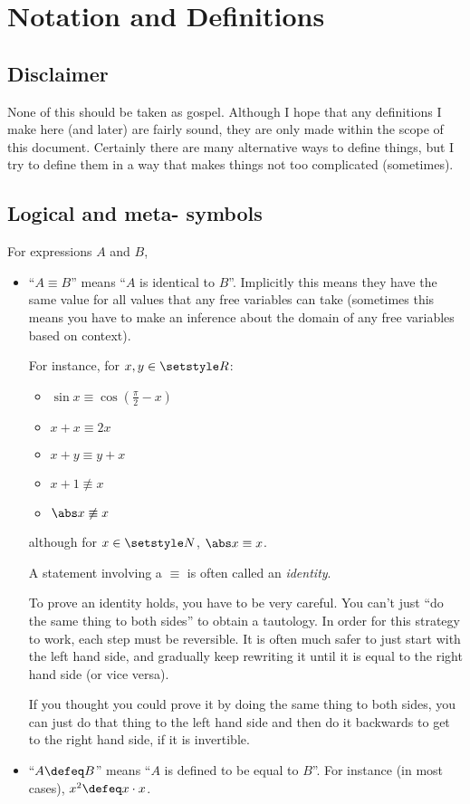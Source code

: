 \section{Notation and Definitions}

\subsection{Disclaimer}

None of this should be taken as gospel. Although I hope that any definitions I
make here (and later) are fairly sound, they are only made within the scope of
this document. Certainly there are many alternative ways to define things, but I
try to define them in a way that makes things not too complicated (sometimes).

\subsection{Logical and meta- symbols}
For expressions \(A\) and \(B\),
\begin{itemize}
 \item
  ``\(A \equiv B\)'' means ``\(A\) is identical to \(B\)''. Implicitly this
  means they have the same value for all values that any free variables can take
  (sometimes this means you have to make an inference about the domain of any
  free variables based on context).

  For instance, for \(x, y \in \Reals\):
  \begin{itemize}[label=\raisebox{0.2ex}{\tiny\textbullet}]
   \item \(\sin x \equiv \cos(\frac \pi 2 - x)\)
   \item \(x + x \equiv 2x\)
   \item \(x + y \equiv y + x\)
   \item \(x + 1 \nequiv x\)
   \item \(\abs x \nequiv x\)
  \end{itemize}
  although for \(x \in \Naturals\), \(\abs x \equiv x\).

  A statement involving a \(\equiv\) is often called an \emph{identity}.

  To prove an identity holds, you have to be very careful. You can't just ``do
  the same thing to both sides'' to obtain a tautology. In order for this
  strategy to work, each step must be reversible. It is often much safer to just
  start with the left hand side, and gradually keep rewriting it until it is
  equal to the right hand side (or vice versa).

  If you thought you could prove it by doing the same thing to both sides, you
  can just do that thing to the left hand side and then do it backwards to get
  to the right hand side, if it is invertible.
 \item
  ``\(A \defeq B\)'' means ``\(A\) is defined to be equal to \(B\)''. For
  instance (in most cases), \(x^2 \defeq x \cdot x\).
\end{itemize}
